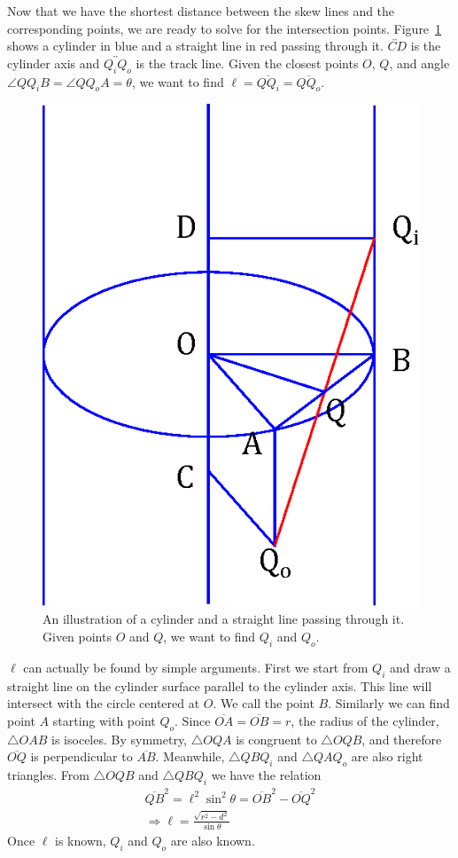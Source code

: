 Now that we have the shortest distance between the skew lines and the corresponding points, we are ready to solve for the intersection points. Figure~\ref{fig:cyl_line} shows a cylinder in blue and a straight line in red passing through it. $\overleftrightarrow{CD}$ is the cylinder axis and $\overleftrightarrow{Q_iQ_o}$ is the track line. Given the closest points $O$, $Q$, and angle $\angle QQ_iB=\angle QQ_oA=\theta$, we want to find $\ell=\overline{QQ_i}=\overline{QQ_o}$.
\begin{figure}
	\centering
	\includegraphics[width=.4\textwidth]{figures/appendixA/cylinder_line.eps}
	\caption{An illustration of a cylinder and a straight line passing through it. Given points $O$ and $Q$, we want to find $Q_i$ and $Q_o$.}
	\label{fig:cyl_line}
\end{figure}

$\ell$ can actually be found by simple arguments. First we start from $Q_i$ and draw a straight line on the cylinder surface parallel to the cylinder axis. This line will intersect with the circle centered at $O$. We call the point $B$. Similarly we can find point $A$ starting with point $Q_o$. Since $\overline{OA}=\overline{OB}=r$, the radius of the cylinder, $\triangle OAB$ is isoceles. By symmetry, $\triangle OQA$ is congruent to $\triangle OQB$, and therefore $\overline{OQ}$ is perpendicular to $\overline{AB}$. Meanwhile, $\triangle QBQ_i$ and $\triangle QAQ_o$ are also right triangles. From $\triangle OQB$ and $\triangle QBQ_i$ we have the relation
\begin{gather}
  \overline{QB}^2=\ell^2\sin^2\theta=\overline{OB}^2-\overline{OQ}^2 \\
  \Rightarrow \ell=\frac{\sqrt{r^2-d^2}}{\sin\theta}
\end{gather}
Once $\ell$ is known, $Q_i$ and $Q_o$ are also known.

